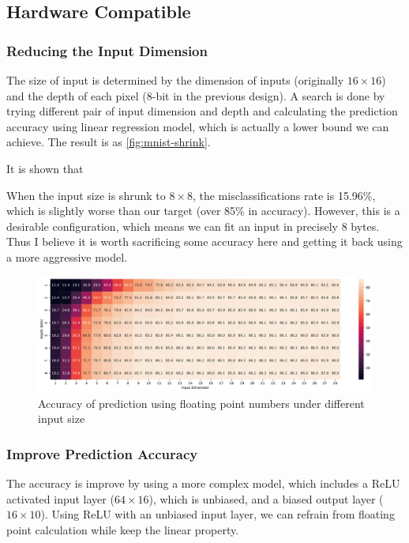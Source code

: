 \subsection{Hardware Compatible}

\subsubsection{Reducing the Input Dimension}

The size of input is determined by the dimension of inputs (originally \(16 \times 16\)) and the depth of each pixel (8-bit in the previous design).
A search is done by trying different pair of input dimension and depth and calculating the prediction accuracy using linear regression model, which is actually a lower bound we can achieve.
The result is as \autoref{fig:mnist-shrink}.

It is shown that

When the input size is shrunk to \(8 \times 8\), the misclassifications rate is 15.96\%, which is slightly worse than our target (over 85\% in accuracy).
However, this is a desirable configuration, which means we can fit an input in precisely 8 bytes.
Thus I believe it is worth sacrificing some accuracy here and getting it back using a more aggressive model.

\begin{figure}[ht!]
    \centering
    \includegraphics[width=\textwidth]{images/mnist-shrink.pdf}
    \caption{Accuracy of prediction using floating point numbers under different input size}
    \label{fig:mnist-shrink}
\end{figure}

\subsubsection{Improve Prediction Accuracy}

The accuracy is improve by using a more complex model, which includes a ReLU activated input layer (\(64 \times 16\)), which is unbiased, and a biased output layer (\(16\times 10\)).
Using ReLU with an unbiased input layer, we can refrain from floating point calculation while keep the linear property.

